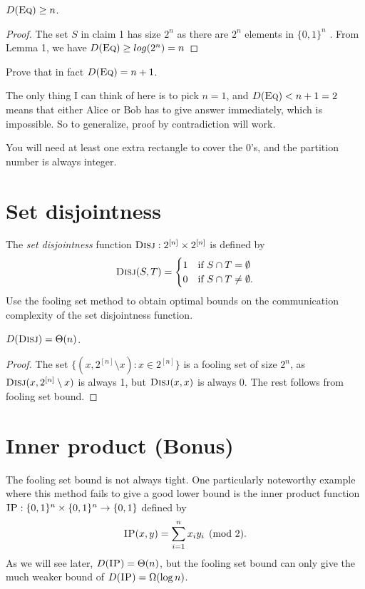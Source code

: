 \begin{theorem}
$D(\textsc{Eq}) \ge n$.
\end{theorem}

\begin{proof}
The set $S$ in claim 1 has size $2^n$ as there are $2^n$ elements in $\{0, 1\}^n$ . From Lemma 1, we have $D(\textsc{Eq}) \ge log (2^n) = n$
\end{proof}

\exercises

\begin{exercise}
Prove that in fact $D(\textsc{Eq}) = n+1$.
\end{exercise}
The only thing I can think of here is to pick $n = 1$, and $D(\textsc{Eq}) < n + 1 = 2$  means that either Alice or Bob has to give answer immediately, which is impossible. So to generalize, proof by contradiction will work. 

You will need at least one extra rectangle to cover the 0's, and the partition number is always integer. 

\newpage \section{Set disjointness}

The \emph{set disjointness} function $\textsc{Disj} : 2^{[n]} \times 2^{[n]}$ is defined by
\[
\textsc{Disj}(S,T) = \begin{cases}
1 & \mbox{if } S \cap T = \emptyset \\
0 & \mbox{if } S \cap T \neq \emptyset.
\end{cases}
\]
Use the fooling set method to obtain optimal bounds on the communication complexity of the set disjointness function.

\begin{theorem}
$D(\textsc{Disj}) = \Theta(n)$.
\end{theorem}

\begin{proof}
The set $\{ (x, 2^{[n]}\setminus x): x\in  2^{[n]}\}$  is a fooling set of size $2^n$, as $\textsc{Disj}(x, 2^{[n]}\setminus x)$ is always 1, but $\textsc{Disj}(x, x)$ is always 0. The rest follows from fooling set bound.
\end{proof}



\newpage \section{Inner product (Bonus)}

The fooling set bound is not always tight. One particularly noteworthy example where this method fails to give a good lower bound is the inner product function  $\textsc{IP} : \{0,1\}^n \times \{0,1\}^n \to \{0,1\}$ defined by
\[
\textsc{IP}(x,y) = \sum_{i=1}^n x_i y_i \pmod{2}.
\]
As we will see later, $D(\textsc{IP}) = \Theta(n)$, but the fooling set bound can only give the much weaker bound of $D(\textsc{IP}) = \Omega(\log n)$.

